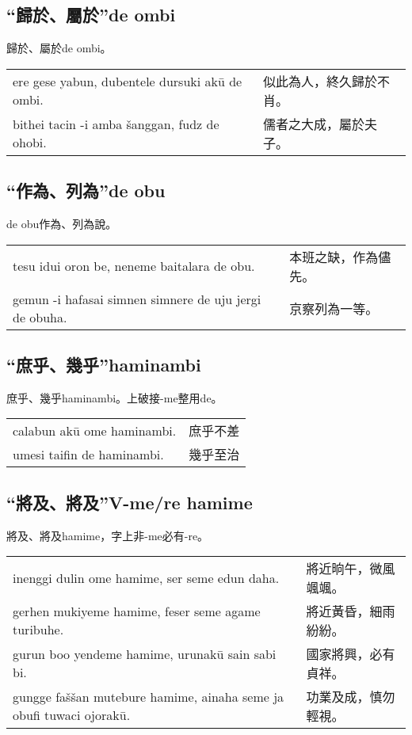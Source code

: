 \documentclass{article}
\begin{document}
\subsection{“歸於、屬於”de ombi}
\noindent 歸於、屬於de ombi。
\begin{center}
    \begin{tabularx}{\textwidth}{XX}
        ere gese yabun, dubentele dursuki ak\={u} de ombi. & 似此為人，終久歸於不肖。\\
        bithei tacin -i amba \v{s}anggan, fudz de ohobi. & 儒者之大成，屬於夫子。
    \end{tabularx}
\end{center}

\subsection{“作為、列為”de obu}
\noindent de obu作為、列為說。
\begin{center}
    \begin{tabularx}{\textwidth}{XX}
        tesu idui oron be, neneme baitalara de obu. & 本班之缺，作為儘先。\\
        gemun -i hafasai simnen simnere de uju jergi de obuha. & 京察列為一等。
    \end{tabularx}
\end{center}

\subsection{“庶乎、幾乎”haminambi}
\noindent 庶乎、幾乎haminambi。上破接-me整用de。
\begin{center}
    \begin{tabularx}{\textwidth}{XX}
        calabun ak\={u} ome haminambi. & 庶乎不差\\
        umesi taifin de haminambi. & 幾乎至治
    \end{tabularx}
\end{center}

\subsection{“將及、將及”V-me/re hamime}
\noindent 將及、將及hamime，字上非-me必有-re。
\begin{center}
    \begin{tabularx}{\textwidth}{XX}
        inenggi dulin ome hamime, ser seme edun daha. & 將近晌午，微風颯颯。\\
        gerhen mukiyeme hamime, feser seme agame turibuhe. & 將近黃昏，細雨紛紛。\\
        gurun boo yendeme hamime, urunak\={u} sain sabi bi. & 國家將興，必有貞祥。\\
        gungge fa\v{s}\v{s}an mutebure hamime, ainaha seme ja obufi tuwaci ojorak\={u}. & 功業及成，慎勿輕視。
    \end{tabularx}
\end{center}
\end{document}
